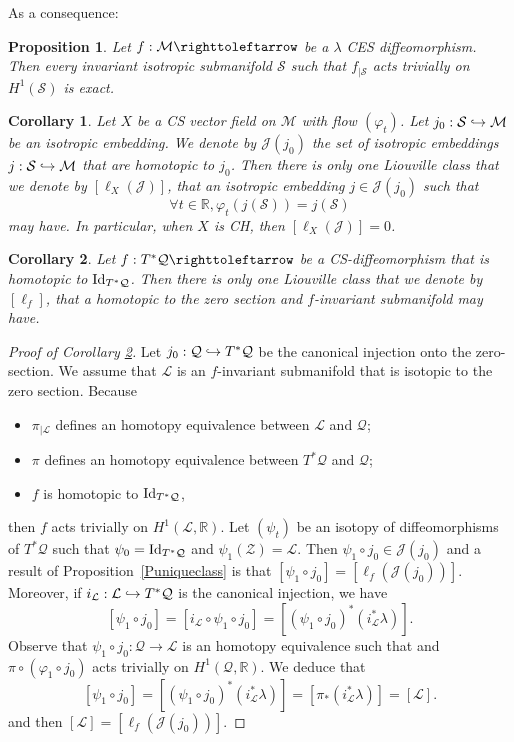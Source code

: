 \documentclass[JEP,XML,SOM,Unicode,published]{cedram}
\def\hto{\mathrel{\lhook\joinrel\to}}
\newtheorem{corollary}{Corollary}
\newtheorem{proposition}{Proposition}
\theoremstyle{definition}
\def\R{\mathbb{R}}
\def\cL{{\mathcal L}}
\def\cJ{{\mathcal J}}
\def\cM{{\mathcal M}}
\def\cQ{{\mathcal Q}}
\def\cS{{\mathcal S}}
\def\cZ{{\mathcal Z}}
\begin{document}
As a consequence:

\begin{proposition} \label{Pinvalagrexact}
Let $f:\cM \righttoleftarrow$ be a $\lambda$ CES diffeomorphism. Then every invariant isotropic submanifold { $\cS$ such that $f_{|\cS}$ acts trivially on $H^1(\cS)$} is exact.
\end{proposition}

\begin{corollary}\label{Cuniqueclassflow}
Let $X$ be a CS vector field on $\cM$ with flow $(\varphi_t)$. Let $ j_0:\cS\hto\cM$ be an isotropic embedding. We denote by $\cJ(j_0)$ the set of isotropic embeddings $ j:\cS\hto\cM$ that are homotopic to $j_0$. Then there is only one Liouville class that we denote by $[\ell_X(\cJ)]$, that an isotropic embedding $j\in\cJ(j_0)$ such that
\[
\forall t\in\R, \varphi_t(j(\cS))=j(\cS)
\]
may have.
In particular, when $X$ is CH, then $[\ell_X(\cJ)]=0$.
\end{corollary}

\begin{corollary}\label{Cuniqueclasscotangent}
Let $f: T^*\cQ \righttoleftarrow$ be a CS-diffeomorphism that is homotopic to ${\rm Id}_{T^*\cQ}$. Then there is only one Liouville class that we denote by $[\ell_f]$, that a homotopic to the zero section and $f$-invariant submanifold may have.
\end{corollary}

\begin{proof}[Proof of Corollary \ref{Cuniqueclasscotangent}] Let $j_0: \cQ{}\hto T^*\cQ$ be the canonical injection onto the zero-section.
We assume that $\cL$ is an $f$-invariant submanifold that is isotopic to the zero section.
Because
\begin{itemize}
\item
$\pi_{|\cL}$ defines an homotopy equivalence between $\cL$ and $\cQ$;
\item
$\pi$ defines an homotopy equivalence between $T^*\cQ$ and $\cQ$;
\item
$f$ is homotopic to ${\rm Id}_{T^*\cQ}$,
\end{itemize}
then $f$ acts trivially on $H^1(\cL,\R)$.
Let $(\psi_t)$ be an isotopy of diffeomorphisms of $T^*\cQ$ such that $\psi_0={\rm Id}_{T^*\cQ}$ and $\psi_1(\cZ)=\cL$. Then $\psi_1\circ j_0\in \cJ(j_0)$ and
a result of Proposition~\ref{Puniqueclass} is that $[\psi_1\circ j_0]=[\ell_f(\cJ(j_0))]$.
Moreover, if $i_\cL:\cL\hto T^*\cQ$ is the canonical injection, we have
\[
[\psi_1\circ j_0]=[i_\cL\circ\psi_1\circ j_0]=[(\psi_1\circ j_0)^*(i_\cL^*\lambda)].
\]
Observe that $\psi_1\circ j_0:\cQ\to \cL$ is an homotopy equivalence such that and $\pi\circ (\varphi_1\circ j_0)$ acts trivially on $H^1(\cQ, \R)$. We deduce that
\[
[\psi_1\circ j_0]=[(\psi_1\circ j_0)^*(i_\cL^*\lambda)]=[\pi_*(i_\cL^*\lambda)]=[\cL].
\]
and then $[\cL]=[\ell_f(\cJ(j_0))]$.
\end{proof}
\end{document}
